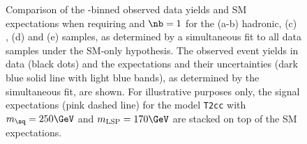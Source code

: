 \begin{figure}[t!]
\begin{center}
{    } 
    \caption{\label{fig:best-fit-ge4j1b} Comparison of the
      \scalht-binned observed data yields and SM expectations when
      requiring \njethigh and $\nb = 1$ for the (a-b) hadronic, (c)
      \mj, (d) \mmj and (e) \gj samples, as determined by a
      simultaneous fit to all data samples under the SM-only
      hypothesis. The observed event yields in data (black dots) and
      the expectations and their uncertainties (dark blue solid line
      with light blue bands), as determined by the simultaneous fit,
      are shown. For illustrative purposes only, the signal
      expectations (pink dashed line) for the model \texttt{T2cc} with
      $m_{\sq} = 250\GeV$ and $m_{\text{LSP}} = 170\GeV$ are stacked
      on top of the SM expectations.}
  \end{center}
\end{figure}

